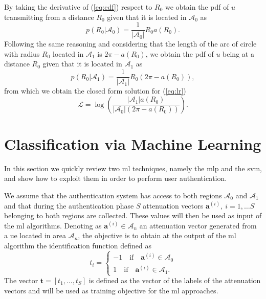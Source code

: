 \documentclass[twocolumns]{IEEEtran}
\begin{document}
By taking the derivative of (\ref{eq:cdf}) respect to $R_0$ we obtain the \ac{pdf} of $u$ transmitting from a distance $R_0$ given that it is located in $\mathcal{A}_0$ as
\begin{equation}
    p(R_0|\mathcal{A}_0) = \frac{1}{|\mathcal{A}_0|}R_0a(R_0).
\end{equation}
Following the same reasoning and considering that the length of the arc of circle with radius $R_0$ located in $\mathcal{A}_1$ is $2\pi - a(R_0)$, we obtain the \ac{pdf} of $u$ being at a distance $R_0$ given that it is located in $\mathcal{A}_1$ as
\begin{equation}
     p(R_0|\mathcal{A}_1) = \frac{1}{|\mathcal{A}_1|}R_0\left(2\pi-a(R_0)\right),
\end{equation}
from which we obtain the closed form solution for (\ref{eq:lr}) 
\begin{equation}
    \mathcal{L}=\log\left(\frac{|\mathcal{A}_1|a(R_0)}{|\mathcal{A}_0|\left(2\pi-a(R_0)\right)}\right).
\end{equation}

\section{Classification via Machine Learning}
In this section we quickly review two \ac{ml} techniques, namely the \ac{mlp} and the \ac{svm}, and show how to exploit them in order to perform user authentication.

We assume that the authentication system has access to both regions $\mathcal{A}_0$ and $\mathcal{A}_1$ and that during the authentication phase $S$ attenuation vectors $\bm{a}^{(i)}, \ i=1,\dots S$  belonging to both regions are collected. These values will then be used as input of the \ac{ml} algorithms. Denoting as $\bm{a}^{(i)}\in \mathcal{A}_n$ an attenuation vector generated from a \ac{ue} located in area $\mathcal{A}_{n}$, the objective is to obtain at the output of the \ac{ml} algorithm the identification function defined as
\begin{equation}
  t_i =
  \begin{cases}
  -1 \quad \text{if} \quad \bm{a}^{(i)} \in \mathcal{A}_0\\
  1 \quad \text{if} \quad \bm{a}^{(i)} \in \mathcal{A}_1.
  \end{cases}
\end{equation}
The vector $\bm{t}=[t_1,...,t_S]$ is defined as the vector of the labels of the attenuation vectors and will be used as training objective for the \ac{ml} approaches.
\end{document}
